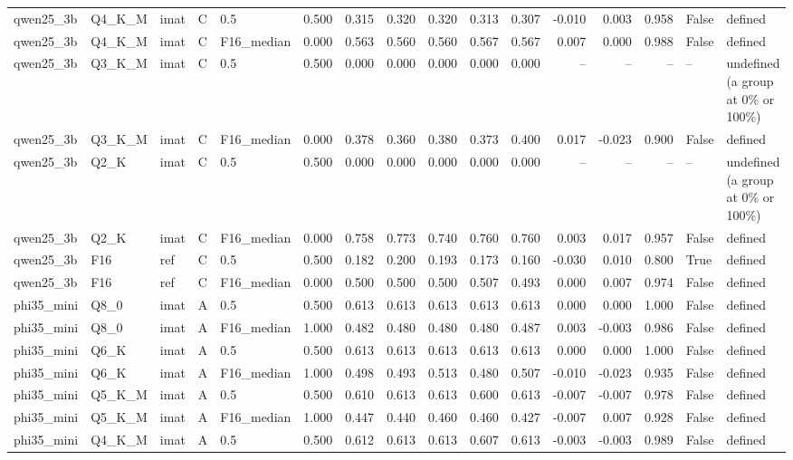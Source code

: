 \begin{tabular}{lllllrrrrrrrrrll}
qwen25\_3b & Q4\_K\_M & imat & C & 0.5 & 0.500 & 0.315 & 0.320 & 0.320 & 0.313 & 0.307 & -0.010 & 0.003 & 0.958 & False & defined \\
qwen25\_3b & Q4\_K\_M & imat & C & F16\_median & 0.000 & 0.563 & 0.560 & 0.560 & 0.567 & 0.567 & 0.007 & 0.000 & 0.988 & False & defined \\
qwen25\_3b & Q3\_K\_M & imat & C & 0.5 & 0.500 & 0.000 & 0.000 & 0.000 & 0.000 & 0.000 & -- & -- & -- & -- & undefined (a group at 0\% or 100\%) \\
qwen25\_3b & Q3\_K\_M & imat & C & F16\_median & 0.000 & 0.378 & 0.360 & 0.380 & 0.373 & 0.400 & 0.017 & -0.023 & 0.900 & False & defined \\
qwen25\_3b & Q2\_K & imat & C & 0.5 & 0.500 & 0.000 & 0.000 & 0.000 & 0.000 & 0.000 & -- & -- & -- & -- & undefined (a group at 0\% or 100\%) \\
qwen25\_3b & Q2\_K & imat & C & F16\_median & 0.000 & 0.758 & 0.773 & 0.740 & 0.760 & 0.760 & 0.003 & 0.017 & 0.957 & False & defined \\
qwen25\_3b & F16 & ref & C & 0.5 & 0.500 & 0.182 & 0.200 & 0.193 & 0.173 & 0.160 & -0.030 & 0.010 & 0.800 & True & defined \\
qwen25\_3b & F16 & ref & C & F16\_median & 0.000 & 0.500 & 0.500 & 0.500 & 0.507 & 0.493 & 0.000 & 0.007 & 0.974 & False & defined \\
phi35\_mini & Q8\_0 & imat & A & 0.5 & 0.500 & 0.613 & 0.613 & 0.613 & 0.613 & 0.613 & 0.000 & 0.000 & 1.000 & False & defined \\
phi35\_mini & Q8\_0 & imat & A & F16\_median & 1.000 & 0.482 & 0.480 & 0.480 & 0.480 & 0.487 & 0.003 & -0.003 & 0.986 & False & defined \\
phi35\_mini & Q6\_K & imat & A & 0.5 & 0.500 & 0.613 & 0.613 & 0.613 & 0.613 & 0.613 & 0.000 & 0.000 & 1.000 & False & defined \\
phi35\_mini & Q6\_K & imat & A & F16\_median & 1.000 & 0.498 & 0.493 & 0.513 & 0.480 & 0.507 & -0.010 & -0.023 & 0.935 & False & defined \\
phi35\_mini & Q5\_K\_M & imat & A & 0.5 & 0.500 & 0.610 & 0.613 & 0.613 & 0.600 & 0.613 & -0.007 & -0.007 & 0.978 & False & defined \\
phi35\_mini & Q5\_K\_M & imat & A & F16\_median & 1.000 & 0.447 & 0.440 & 0.460 & 0.460 & 0.427 & -0.007 & 0.007 & 0.928 & False & defined \\
phi35\_mini & Q4\_K\_M & imat & A & 0.5 & 0.500 & 0.612 & 0.613 & 0.613 & 0.607 & 0.613 & -0.003 & -0.003 & 0.989 & False & defined \\

\end{tabular}
